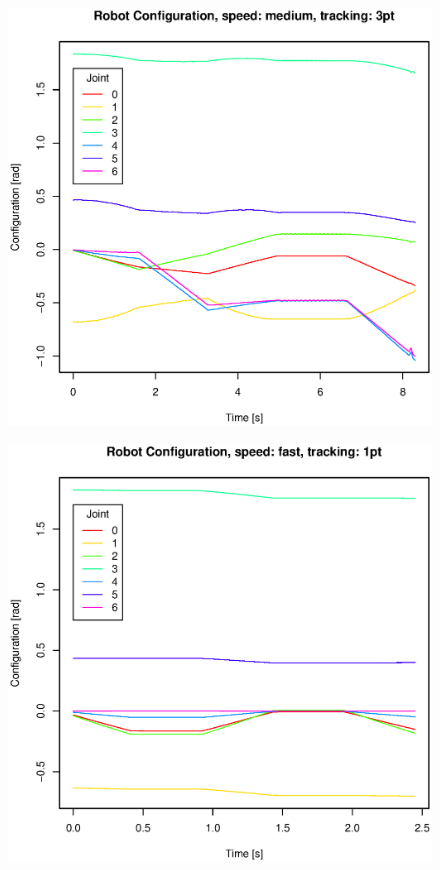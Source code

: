 \begin{figure}[H]
\centering
\includegraphics[width= \linewidth]{graphics/robotics/robotConfiguration_medium_3pt}
\caption{}
\label{fig:}
\end{figure}

\begin{figure}[H]
\centering
\includegraphics[width= \linewidth]{graphics/robotics/robotConfiguration_fast_1pt}
\caption{}
\label{fig:}
\end{figure}


